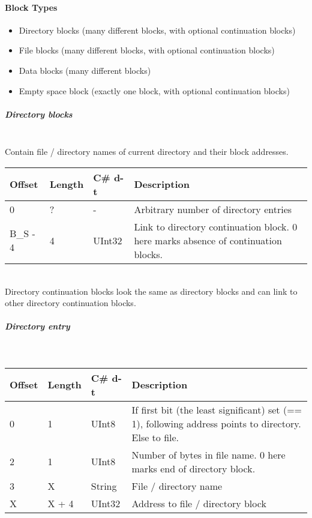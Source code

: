 \documentclass[a4paper,12pt]{article}
\begin{document}
\paragraph{Block Types}

\begin{itemize}
	\item Directory blocks (many different blocks, with optional continuation blocks)
	\item File blocks (many different blocks, with optional continuation blocks)
	\item Data blocks (many different blocks)
	\item Empty space block (exactly one block, with optional continuation blocks)
\end{itemize}

\subparagraph{Directory blocks} \mbox{} \\

Contain file / directory names of current directory and their block addresses.\\

\begin{tabular}{|p{1.5cm}|p{1.5cm}|p{1.5cm}|p{7cm}|}\hline
Offset 	&Length	&C\# d-t	&Description\\\hline
0	&?	&-	&Arbitrary number of directory entries\\
B\_S - 4	&4	&UInt32	&Link to directory continuation block. 0 here marks absence of continuation blocks.\\\hline
\end{tabular} \\

Directory continuation blocks look the same as directory blocks and can link to other directory continuation blocks.

\subparagraph{Directory entry} \mbox{} \\

\begin{tabular}{|p{1.5cm}|p{1.5cm}|p{1.5cm}|p{7cm}|}\hline
Offset 	&Length	&C\# d-t	&Description\\\hline
0	&1	&UInt8	&If first bit (the least significant) set (== 1), following address points to directory. Else to file.\\
2	&1	&UInt8	&Number of bytes in file name. 0 here marks end of directory block.\\
3	&X	&String	&File / directory name\\
X	&X + 4	&UInt32	&Address to file / directory block\\\hline
\end{tabular} \\
\end{document}
